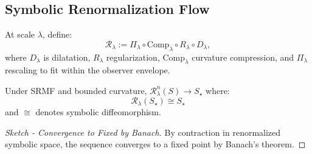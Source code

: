 \subsection*{Symbolic Renormalization Flow}
\label{sec:bk8_symbolic_renormalization_flow}
\begin{definition}
\label{definition:bk8_sr_renormalization_group}
At scale \( \lambda \), define:
\[
\mathcal{R}_\lambda := \Pi_\lambda \circ \mathrm{Comp}_\lambda \circ R_\lambda \circ D_\lambda,
\]
where \( D_\lambda \) is dilatation, \( R_\lambda \) regularization, \( \mathrm{Comp}_\lambda \) curvature compression, and \( \Pi_\lambda \) rescaling to fit within the observer envelope.
\end{definition}
\begin{theorem}
\label{theorem:bk8_rg_fixed_point}
Under SRMF and bounded curvature, \( \mathcal{R}_\lambda^n(S) \to S_\star \) where:
\[
\mathcal{R}_\lambda(S_\star) \cong S_\star
\]
and \( \cong \) denotes symbolic diffeomorphism.
\end{theorem}
\begin{proof}[Sketch - Convergence to Fixed by Banach]
\label{proof:bk8_sketch_convergence_to-fixed_by_banach}
By contraction in renormalized symbolic space, the sequence converges to a fixed point by Banach's theorem.
\end{proof}
